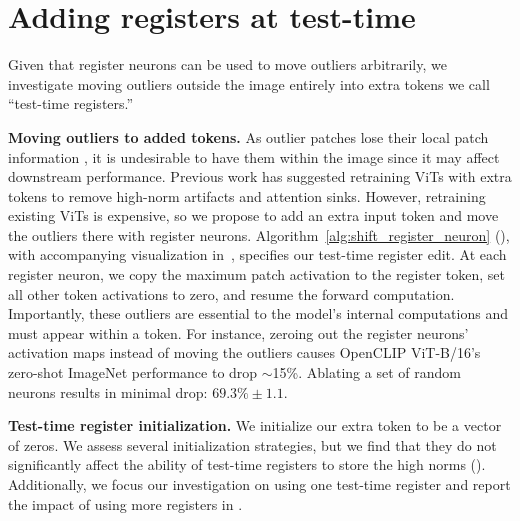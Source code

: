 \documentclass{article}
\begin{document}
\section{Adding registers at test-time}
\label{sec:mimic_registers}
Given that register neurons can be used to move outliers arbitrarily, we investigate moving outliers outside the image entirely into extra tokens we call ``test-time registers.'' 


\textbf{Moving outliers to added tokens.} As outlier patches lose their local patch information \citep{darcet2024vision}, it is undesirable to have them within the image since it may affect downstream performance. Previous work has suggested retraining ViTs with extra tokens to remove high-norm artifacts and attention sinks. However, retraining existing ViTs is expensive, so we propose to add an extra input token and move the outliers there with register neurons. Algorithm~\ref{alg:shift_register_neuron} (), with accompanying visualization in~, specifies our test-time register edit. At each register neuron, we copy the maximum patch activation to the register token, set all other token activations to zero, and resume the forward computation. Importantly, these outliers are essential to the model’s internal computations and must appear within a token. For instance, zeroing out the register neurons' activation maps instead of moving the outliers causes OpenCLIP ViT-B/16's zero-shot ImageNet performance to drop $\sim$15\%. Ablating a set of random neurons results in minimal drop: $69.3\%\pm1.1.$ 









\textbf{Test-time register initialization.} We initialize our extra token to be a vector of zeros. We assess several initialization strategies, but we find that they do not significantly affect the ability of test-time registers to store the high norms (). Additionally, we focus our investigation on using one test-time register and report the impact of using more registers in .
\end{document}
